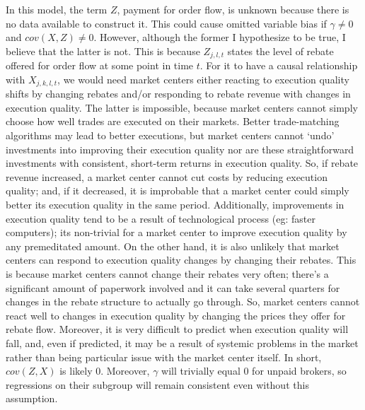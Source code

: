 \documentclass[12pt,a4paper]{article}
\begin{document}
	In this model, the term $Z$, payment for order flow, is unknown because there is no data available to construct it. This could cause omitted variable bias if $\gamma \neq 0$ and $cov(X, Z) \neq 0$. However, although the former I hypothesize to be true, I believe that the latter is not. This is because $Z_{j, l, t}$ states the level of rebate offered for order flow at some point in time $t$. For it to have a causal relationship with $X_{j, k, l, t}$, we would need market centers either reacting to execution quality shifts by changing rebates and/or responding to rebate revenue with changes in execution quality. The latter is impossible, because market centers cannot simply choose how well trades are executed on their markets. Better trade-matching algorithms may lead to better executions, but market centers cannot `undo' investments into improving their execution quality nor are these straightforward investments with consistent, short-term returns in execution quality. So, if rebate revenue increased, a market center cannot cut costs by reducing execution quality; and, if it decreased, it is improbable that a market center could simply better its execution quality in the same period. Additionally, improvements in execution quality tend to be a result of technological process (eg: faster computers); its non-trivial for a market center to improve execution quality by any premeditated amount. On the other hand, it is also unlikely that market centers can respond to execution quality changes by changing their rebates. This is because market centers cannot change their rebates very often; there's a significant amount of paperwork involved and it can take several quarters for changes in the rebate structure to actually go through. So, market centers cannot react well to changes in execution quality by changing the prices they offer for rebate flow. Moreover, it is very difficult to predict when execution quality will fall, and, even if predicted, it may be a result of systemic problems in the market rather than being particular issue with the market center itself. In short, $cov(Z, X)$ is likely $0$. Moreover, $\gamma$ will trivially equal $0$ for unpaid brokers, so regressions on their subgroup will remain consistent even without this assumption. 
	
\end{document}
